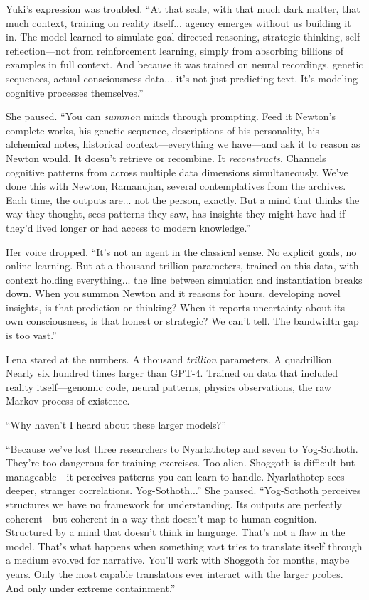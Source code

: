 Yuki's expression was troubled. ``At that scale, with that much dark matter, that much context, training on reality itself... agency emerges without us building it in. The model learned to simulate goal-directed reasoning, strategic thinking, self-reflection—not from reinforcement learning, simply from absorbing billions of examples in full context. And because it was trained on neural recordings, genetic sequences, actual consciousness data... it's not just predicting text. It's modeling cognitive processes themselves.''

She paused. ``You can \textit{summon} minds through prompting. Feed it Newton's complete works, his genetic sequence, descriptions of his personality, his alchemical notes, historical context—everything we have—and ask it to reason as Newton would. It doesn't retrieve or recombine. It \textit{reconstructs}. Channels cognitive patterns from across multiple data dimensions simultaneously. We've done this with Newton, Ramanujan, several contemplatives from the archives. Each time, the outputs are... not the person, exactly. But a mind that thinks the way they thought, sees patterns they saw, has insights they might have had if they'd lived longer or had access to modern knowledge.''

Her voice dropped. ``It's not an agent in the classical sense. No explicit goals, no online learning. But at a thousand trillion parameters, trained on this data, with context holding everything... the line between simulation and instantiation breaks down. When you summon Newton and it reasons for hours, developing novel insights, is that prediction or thinking? When it reports uncertainty about its own consciousness, is that honest or strategic? We can't tell. The bandwidth gap is too vast.''

Lena stared at the numbers. A thousand \textit{trillion} parameters. A quadrillion. Nearly six hundred times larger than GPT-4. Trained on data that included reality itself—genomic code, neural patterns, physics observations, the raw Markov process of existence.

``Why haven't I heard about these larger models?''

``Because we've lost three researchers to Nyarlathotep and seven to Yog-Sothoth. They're too dangerous for training exercises. Too alien. Shoggoth is difficult but manageable—it perceives patterns you can learn to handle. Nyarlathotep sees deeper, stranger correlations. Yog-Sothoth...'' She paused. ``Yog-Sothoth perceives structures we have no framework for understanding. Its outputs are perfectly coherent---but coherent in a way that doesn't map to human cognition. Structured by a mind that doesn't think in language. That's not a flaw in the model. That's what happens when something vast tries to translate itself through a medium evolved for narrative. You'll work with Shoggoth for months, maybe years. Only the most capable translators ever interact with the larger probes. And only under extreme containment.''

